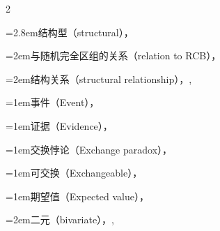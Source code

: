 \begin{multicols}{2}
\par\noindent\hangindent=2.8em\hspace*{1.8em}\label{idx:415}结构型（structural），\hyperref[idxocc:415:505]{\pageref*{idxocc:415:505}}\par
\par\noindent\hangindent=2em\hspace*{1em}\label{idx:416}与随机完全区组的关系（relation to RCB），\hyperref[idxocc:416:506]{\pageref*{idxocc:416:506}}\par
\par\noindent\hangindent=2em\hspace*{1em}\label{idx:417}结构关系（structural relationship），\hyperref[eq:12.2.6]{\pageref*{eq:12.2.6}}, \hyperref[sec:12.6.1]{\pageref*{sec:12.6.1}}\par
\par\addvspace{2pt}
\par\noindent\hangindent=1em\hspace*{0em}\label{idx:418}事件（Event），\hyperref[def:1.1.2]{\pageref*{def:1.1.2}}\par
\par\addvspace{2pt}
\par\noindent\hangindent=1em\hspace*{0em}\label{idx:419}证据（Evidence），\hyperref[idxocc:419:269]{\pageref*{idxocc:419:269}}\par
\par\addvspace{2pt}
\par\noindent\hangindent=1em\hspace*{0em}\label{idx:420}交换悖论（Exchange paradox），\hyperref[sec:4.9.1]{\pageref*{sec:4.9.1}}\par
\par\addvspace{2pt}
\par\noindent\hangindent=1em\hspace*{0em}\label{idx:421}可交换（Exchangeable），\hyperref[exercise:5.4]{\pageref*{exercise:5.4}}\par
\par\addvspace{2pt}
\par\noindent\hangindent=1em\hspace*{0em}\label{idx:422}期望值（Expected value），\hyperref[def:2.2.1]{\pageref*{def:2.2.1}}\par
\par\noindent\hangindent=2em\hspace*{1em}\label{idx:423}二元（bivariate），\hyperref[idxocc:423:147]{\pageref*{idxocc:423:147}}, \hyperref[idxocc:423:149]{\pageref*{idxocc:423:149}}\par

\end{multicols}
